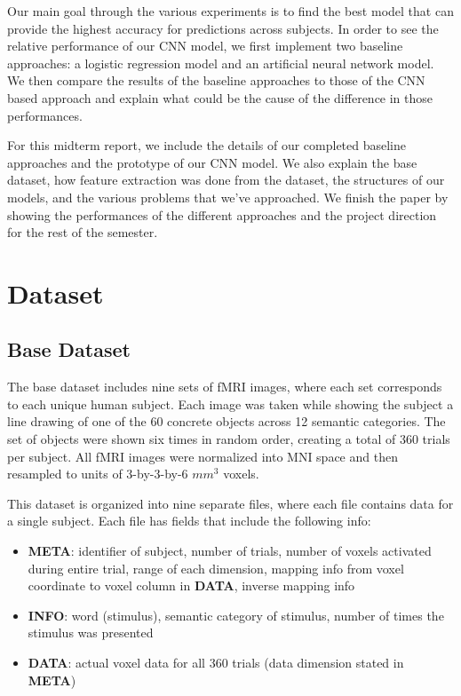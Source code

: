 \documentclass{article} %
\begin{document}
Our main goal through the various experiments is to find the best model that can provide the highest accuracy for predictions across subjects. In order to see the relative performance of our CNN model, we first implement two baseline approaches: a logistic regression model and an artificial neural network model. We then compare the results of the baseline approaches to those of the CNN based approach and explain what could be the cause of the difference in those performances.

For this midterm report, we include the details of our completed baseline approaches and the prototype of our CNN model. We also explain the base dataset, how feature extraction was done from the dataset, the structures of our models, and the various problems that we've approached. We finish the paper by showing the performances of the different approaches and the project direction for the rest of the semester.  

\section{Dataset}

\subsection{Base Dataset}

The base dataset includes nine sets of fMRI images, where each set corresponds to each unique human subject. Each image was taken while showing the subject a line drawing of one of the 60 concrete objects across 12 semantic categories. The set of objects were shown six times in random order, creating a total of 360 trials per subject. All fMRI images were normalized into MNI space and then resampled to units of 3-by-3-by-6 $mm^3$ voxels.

This dataset is organized into nine separate files, where each file contains data for a single subject. Each file has fields that include the following info:
\begin{itemize}
	\item \textbf{META}: identifier of subject, number of trials, number of voxels activated during entire trial, range of each dimension, mapping info from voxel coordinate to voxel column in \textbf{DATA}, inverse mapping info
	\item \textbf{INFO}: word (stimulus), semantic category of stimulus, number of times the stimulus was presented
	\item \textbf{DATA}: actual voxel data for all 360 trials (data dimension stated in \textbf{META})
\end{itemize}
\end{document}
